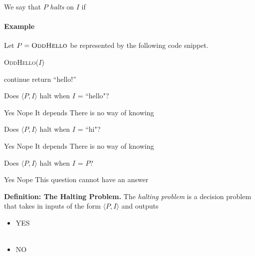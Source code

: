\documentclass[11  pt]{article}
\begin{document}
We say that $P$ \emph{halts} on $I$ if  \\

\paragraph{Example}
Let $P = \textsc{OddHello}$ be represented by the following code snippet.
\begin{algorithm}
	\textsc{OddHello}($I$)
	\begin{algorithmic}
		\State continue
		\EndWhile
		\Else
		\State return ``hello!''
		\EndIf
	\end{algorithmic}
\end{algorithm}

\begin{Qu}
	Does $\langle P, I\rangle$ halt when $I$ = ``hello"?
	\begin{itemize}
		\aitem Yes
		\bitem Nope
		\citem It depends
		\ditem There is no way of knowing
	\end{itemize}
\end{Qu}

\begin{Qu}
Does $\langle P, I\rangle$ halt when $I$ = ``hi"?
	\begin{itemize}
		\aitem Yes
		\bitem Nope
		\citem It depends
		\ditem There is no way of knowing
	\end{itemize}
\end{Qu}

\begin{Qu}
	Does $\langle P, I\rangle$ halt when $I$ = $P$?
	\begin{itemize}
		\aitem Yes 
		\bitem Nope
		\citem This question cannot have an answer
	\end{itemize}
\end{Qu}

\vspace{1cm}

\newpage


\textbf{Definition: The Halting Problem.} The \emph{halting problem} is a decision problem that takes in inputs of the form $\langle P, I \rangle$ and outputs
\begin{itemize}
	\item YES \\ \\%
	\item NO \\%
\end{itemize}
\end{document}
